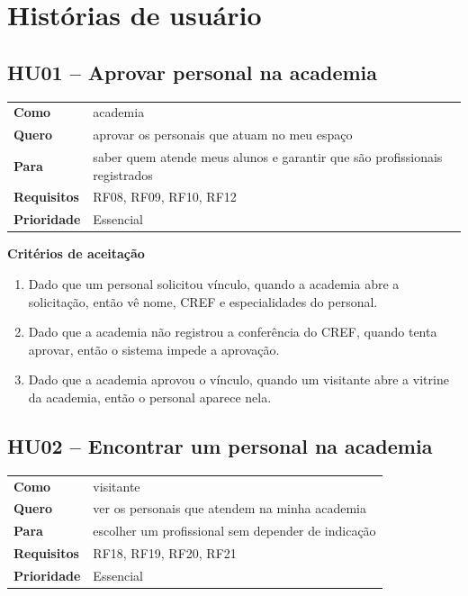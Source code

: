 \section{Histórias de usuário}

\subsection*{HU01 -- Aprovar personal na academia}

\begin{tabularx}{\textwidth}{@{}l L@{}}
  \toprule
  \textbf{Como}       & academia \\
  \textbf{Quero}      & aprovar os personais que atuam no meu espaço \\
  \textbf{Para}       & saber quem atende meus alunos e garantir que são profissionais registrados \\
  \textbf{Requisitos} & RF08, RF09, RF10, RF12 \\
  \textbf{Prioridade} & Essencial \\
  \bottomrule
\end{tabularx}

\textbf{Critérios de aceitação}
\begin{enumerate}
  \item Dado que um personal solicitou vínculo, quando a academia abre a solicitação, então vê nome, CREF e especialidades do personal.
  \item Dado que a academia não registrou a conferência do CREF, quando tenta aprovar, então o sistema impede a aprovação.
  \item Dado que a academia aprovou o vínculo, quando um visitante abre a vitrine da academia, então o personal aparece nela.
\end{enumerate}

\subsection*{HU02 -- Encontrar um personal na academia}

\begin{tabularx}{\textwidth}{@{}l L@{}}
  \toprule
  \textbf{Como}       & visitante \\
  \textbf{Quero}      & ver os personais que atendem na minha academia \\
  \textbf{Para}       & escolher um profissional sem depender de indicação \\
  \textbf{Requisitos} & RF18, RF19, RF20, RF21 \\
  \textbf{Prioridade} & Essencial \\
  \bottomrule
\end{tabularx}

